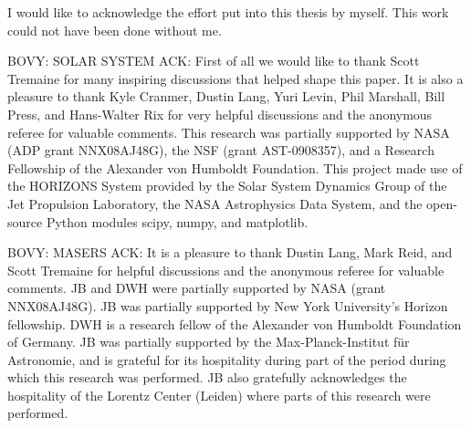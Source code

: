 %
I would like to acknowledge the effort put into this thesis by
myself. This work could not have been done without me.


BOVY: SOLAR SYSTEM ACK: First of all we would like to thank Scott
Tremaine for many inspiring discussions that helped shape this
paper. It is also a pleasure to thank Kyle Cranmer, Dustin Lang, Yuri
Levin, Phil Marshall, Bill Press, and Hans-Walter Rix for very helpful
discussions and the anonymous referee for valuable comments. This
research was partially supported by NASA (ADP grant NNX08AJ48G), the
NSF (grant AST-0908357), and a Research Fellowship of the Alexander
von Humboldt Foundation. This project made use of the HORIZONS System
provided by the Solar System Dynamics Group of the Jet Propulsion
Laboratory, the NASA Astrophysics Data System, and the open-source
Python modules scipy, numpy, and matplotlib.

BOVY: MASERS ACK: It is a pleasure to thank Dustin Lang, Mark Reid,
and Scott Tremaine for helpful discussions and the anonymous referee
for valuable comments. JB and DWH were partially supported by NASA
(grant NNX08AJ48G). JB was partially supported by New York
University's Horizon fellowship. DWH is a research fellow of the
Alexander von Humboldt Foundation of Germany. JB was partially
supported by the Max-Planck-Institut f\"ur Astronomie, and is grateful
for its hospitality during part of the period during which this
research was performed. JB also gratefully acknowledges the
hospitality of the Lorentz Center (Leiden) where parts of this
research were performed.

